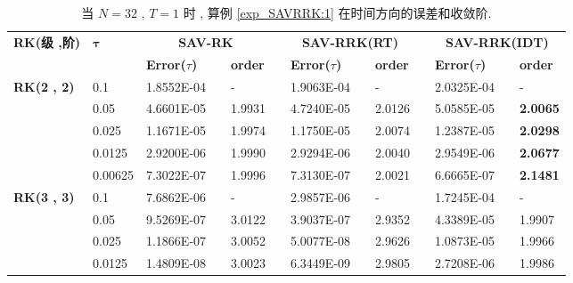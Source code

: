 	\begin{table}[H]\scriptsize
		\centering
		\caption{当 $N=32$ , $T = 1$ 时 , 算例 \ref{exp_SAVRRK:1}  在时间方向的误差和收敛阶.}
		\begin{tabular}{lllllrlrlrlrlrl}
		\toprule
		\multicolumn{2}{l}{\multirow{2}[3]{*}{\textbf{RK(级 ,阶)}}} & \multicolumn{2}{l}{\multirow{2}[3]{*}{$\bm{\tau}$}} & \multicolumn{3}{c}{\textbf{SAV-RK}} &       & \multicolumn{3}{c}{\textbf{SAV-RRK(RT)}} &       & \multicolumn{3}{c}{\textbf{SAV-RRK(IDT)}} \\
		\cmidrule{5-7}\cmidrule{9-11}\cmidrule{13-15}    \multicolumn{2}{l}{} & \multicolumn{2}{l}{} & \textbf{Error($\tau$)} &       & \textbf{order} &       & \textbf{Error($\tau$)} &       & \textbf{order} &       & \textbf{Error($\tau$)} &       & \textbf{order} \\
		\hline
		\multicolumn{2}{l}{\multirow{5}[0]{*}{\textbf{RK(2 , 2)}}} & \multicolumn{2}{l}{0.1} & 1.8552E-04 &       &-    &       & 1.9063E-04 &       &-    &       & 2.0325E-04 &       &-\\
		\multicolumn{2}{l}{} & \multicolumn{2}{l}{0.05} & 4.6601E-05 &       & 1.9931  &       & 4.7240E-05 &       & 2.0126  &       & 5.0585E-05 &       & \textbf{2.0065}  \\
		\multicolumn{2}{l}{} & \multicolumn{2}{l}{0.025} & 1.1671E-05 &       & 1.9974  &       & 1.1750E-05 &       & 2.0074  &       & 1.2387E-05 &       & \textbf{2.0298}  \\
		\multicolumn{2}{l}{} & \multicolumn{2}{l}{0.0125} & 2.9200E-06 &       & 1.9990  &       & 2.9294E-06 &       & 2.0040  &       & 2.9549E-06 &       & \textbf{2.0677}  \\
		\multicolumn{2}{l}{} & \multicolumn{2}{l}{0.00625} & 7.3022E-07 &       & 1.9996  &       & 7.3130E-07 &       & 2.0021  &       & 6.6665E-07 &       & \textbf{2.1481}  \\
		\multicolumn{2}{l}{\multirow{5}[0]{*}{\textbf{RK(3 , 3)}}} & \multicolumn{2}{l}{0.1} & 7.6862E-06 &       &-    &       & 2.9857E-06 &       &-    &       & 1.7245E-04 &       &-\\
		\multicolumn{2}{l}{} & \multicolumn{2}{l}{0.05} & 9.5269E-07 &       & 3.0122  &       & 3.9037E-07 &       & 2.9352  &       & 4.3389E-05 &       & 1.9907  \\
		\multicolumn{2}{l}{} & \multicolumn{2}{l}{0.025} & 1.1866E-07 &       & 3.0052  &       & 5.0077E-08 &       & 2.9626  &       & 1.0873E-05 &       & 1.9966  \\
		\multicolumn{2}{l}{} & \multicolumn{2}{l}{0.0125} & 1.4809E-08 &       & 3.0023  &       & 6.3449E-09 &       & 2.9805  &       & 2.7208E-06 &       & 1.9986  \\

\end{tabular}
\end{table}

